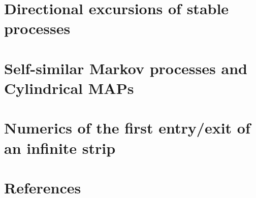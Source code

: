 \documentclass[11pt, twoside]{report}
\begin{document}
\chapter{Directional excursions of stable processes}
\label{chapter:excursions}


\chapter{Self-similar Markov processes and Cylindrical MAPs}
\label{chapter:cylindricalMAP}


%

\chapter{Numerics of the first entry/exit of an infinite strip} 
\label{chapter:numerics}


%
%

\newpage
\chapter*{References}

\printbibliography[heading=none]
\end{document}
